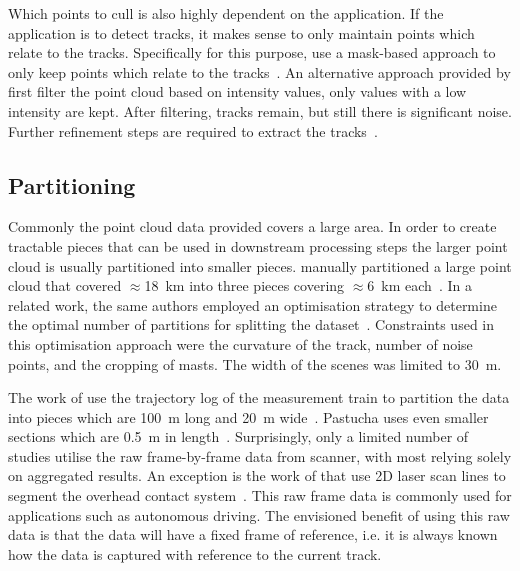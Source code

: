 Which points to cull is also highly dependent on the application. If the application is to detect tracks, it makes sense to only maintain points which relate to the tracks. Specifically for this purpose, \citeauthor{ponciano2015detection} use a mask-based approach to only keep points which relate to the tracks~\cite{ponciano2015detection}. An alternative approach provided by \citeauthor{zou2019efficient} first filter the point cloud based on intensity values, only values with a low intensity are kept. After filtering, tracks remain, but still there is significant noise. Further refinement steps are required to extract the tracks~\cite{zou2019efficient}.

\subsection{Partitioning}
Commonly the point cloud data provided covers a large area. In order to create tractable pieces that can be used in downstream processing steps the larger point cloud is usually partitioned into smaller pieces. \citeauthor{ariyachandra2020digital} manually partitioned a large point cloud that covered \(\approx\)18~km into three pieces covering \(\approx\)6~km each~\cite{ariyachandra2020digital}. In a related work, the same authors employed an optimisation strategy to determine the optimal number of partitions for splitting the dataset~\cite{ariyachandra2020detection}. Constraints used in this optimisation approach were the curvature of the track, number of noise points, and the cropping of masts. The width of the scenes was limited to 30~m.

The work of \citeauthor{lamas2021automatic} use the trajectory log of the measurement train to partition the data into pieces which are 100~m long and 20~m wide~\cite{lamas2021automatic}. Pastucha uses even smaller sections which are 0.5~m in length~\cite{pastucha2016catenary}. Surprisingly, only a limited number of studies utilise the raw frame-by-frame data from scanner, with most relying solely on aggregated results. An exception is the work of \citeauthor{chen2020deep} that use 2D laser scan lines to segment the overhead contact system~\cite{chen2020deep}. This raw frame data is commonly used for applications such as autonomous driving. The envisioned benefit of using this raw data is that the data will have a fixed frame of reference, i.e. it is always known how the data is captured with reference to the current track.

